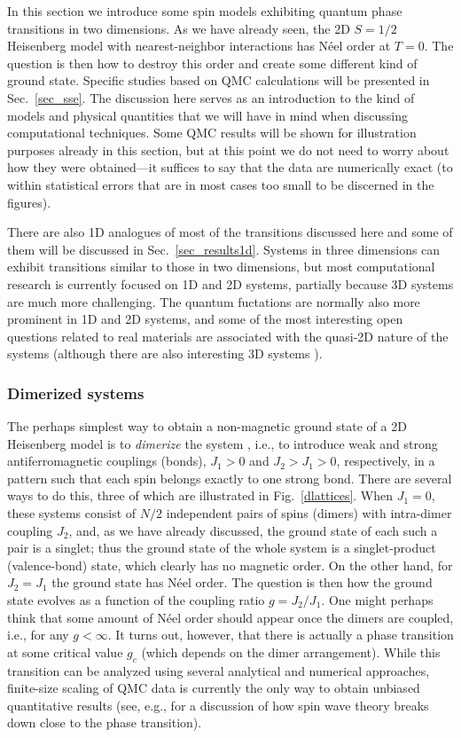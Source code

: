 \documentclass[draft,numberedheadings]{aipproc}
\begin{document}
In this section we introduce some spin models exhibiting quantum phase transitions in two dimensions. As we have already seen, the 2D $S=1/2$ Heisenberg model 
with nearest-neighbor interactions has N\'eel order at $T=0$. The question is then how to destroy this order and create some different kind of ground state. 
Specific studies based on QMC calculations will be presented in Sec.~\ref{sec_sse}. The discussion here serves as an introduction to the kind of models and 
physical quantities that we will have in mind when discussing computational techniques. Some QMC results will be shown for illustration purposes already in 
this section, but at this point we do not need to worry about how they were obtained---it suffices to say that the data are numerically exact (to within 
statistical errors that are in most cases too small to be discerned in the figures). 

There are also 1D analogues of most of the transitions discussed here and some of them will be discussed in Sec.~\ref{sec_results1d}. Systems in three dimensions 
can exhibit transitions similar to those in two dimensions, but most computational research is currently focused on 1D and 2D systems, partially because 3D systems
are much more challenging. The quantum fuctations are normally also more prominent in 1D and 2D systems, and some of the most interesting open questions
related to real materials are associated with the quasi-2D nature of the systems (although there are also interesting 3D systems \cite{ruegg08}).

\subsubsection{Dimerized systems}
\label{dimsystems}

The perhaps simplest way to obtain a non-magnetic ground state of a 2D Heisenberg model is to {\it dimerize} the system \cite{singh88}, 
i.e., to introduce weak and 
strong antiferromagnetic couplings (bonds), $J_1>0$ and $J_2>J_1>0$, respectively, in a pattern such that each spin belongs exactly to one strong bond. There are 
several ways to do this, three of which are illustrated in Fig.~\ref{dlattices}. When $J_1=0$, these systems consist of $N/2$ independent pairs of spins (dimers) 
with intra-dimer coupling $J_2$, and, as we have already discussed, the ground state of each such a pair is a singlet; thus the ground state of the whole system is a 
singlet-product (valence-bond) state, which clearly has no magnetic order. On the other hand, for $J_2=J_1$ the ground state has N\'eel order. The question is 
then how the ground state evolves as a function of the coupling ratio $g=J_2/J_1$. One might perhaps think that some amount of N\'eel order should appear once the 
dimers are coupled, i.e., for any $g<\infty$. It turns out, however, that there is actually a phase transition at some critical value $g_c$ (which depends on
the dimer arrangement). While this transition can be analyzed using several analytical and numerical approaches, finite-size scaling of QMC data 
is currently the only way to obtain unbiased quantitative results (see, e.g., \cite{morr} for a discussion of how spin wave theory breaks 
down close to the phase transition). 
\end{document}
